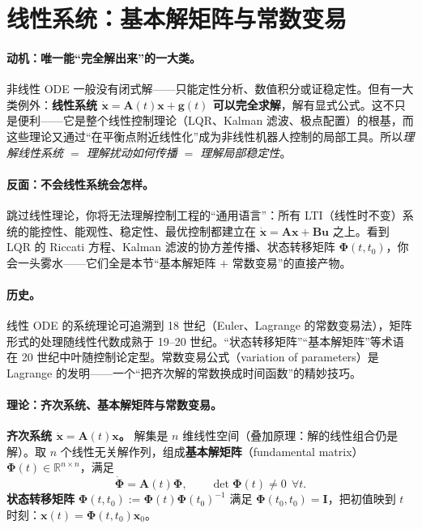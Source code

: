 \section{线性系统：基本解矩阵与常数变易}
\label{sec:ode-linear}

\paragraph{动机：唯一能“完全解出来”的一大类。}
非线性 ODE 一般没有闭式解——只能定性分析、数值积分或证稳定性。但有一大类例外：\textbf{线性系统 $\dot{\mathbf{x}}=\mathbf{A}(t)\mathbf{x}+\mathbf{g}(t)$ 可以完全求解}，解有显式公式。这不只是便利——它是整个线性控制理论（LQR、Kalman 滤波、极点配置）的根基，而这些理论又通过“在平衡点附近线性化”成为非线性机器人控制的局部工具。所以\emph{理解线性系统 $=$ 理解扰动如何传播 $=$ 理解局部稳定性}。

\paragraph{反面：不会线性系统会怎样。}
跳过线性理论，你将无法理解控制工程的“通用语言”：所有 LTI（线性时不变）系统的能控性、能观性、稳定性、最优控制都建立在 $\dot{\mathbf{x}}=\mathbf{A}\mathbf{x}+\mathbf{B}\mathbf{u}$ 之上。看到 LQR 的 Riccati 方程、Kalman 滤波的协方差传播、状态转移矩阵 $\boldsymbol{\Phi}(t,t_0)$，你会一头雾水——它们全是本节“基本解矩阵 $+$ 常数变易”的直接产物\cite{chen1999linear}。

\paragraph{历史。}
线性 ODE 的系统理论可追溯到 18 世纪（Euler、Lagrange 的常数变易法），矩阵形式的处理随线性代数成熟于 19--20 世纪。“状态转移矩阵”“基本解矩阵”等术语在 20 世纪中叶随控制论定型。常数变易公式（variation of parameters）是 Lagrange 的发明——一个“把齐次解的常数换成时间函数”的精妙技巧。

\paragraph{理论：齐次系统、基本解矩阵与常数变易。}

\textbf{齐次系统 $\dot{\mathbf{x}}=\mathbf{A}(t)\mathbf{x}$。} 解集是 $n$ 维线性空间（叠加原理：解的线性组合仍是解）。取 $n$ 个线性无关解作列，组成\textbf{基本解矩阵}（fundamental matrix）$\boldsymbol{\Phi}(t)\in\mathbb{R}^{n\times n}$，满足
\begin{equation}
  \dot{\boldsymbol{\Phi}}=\mathbf{A}(t)\boldsymbol{\Phi},\qquad \det\boldsymbol{\Phi}(t)\neq0\ \ \forall t.
  \label{eq:fund-matrix}
\end{equation}
\textbf{状态转移矩阵} $\boldsymbol{\Phi}(t,t_0):=\boldsymbol{\Phi}(t)\boldsymbol{\Phi}(t_0)^{-1}$ 满足 $\boldsymbol{\Phi}(t_0,t_0)=\mathbf{I}$，把初值映到 $t$ 时刻：$\mathbf{x}(t)=\boldsymbol{\Phi}(t,t_0)\mathbf{x}_0$。

